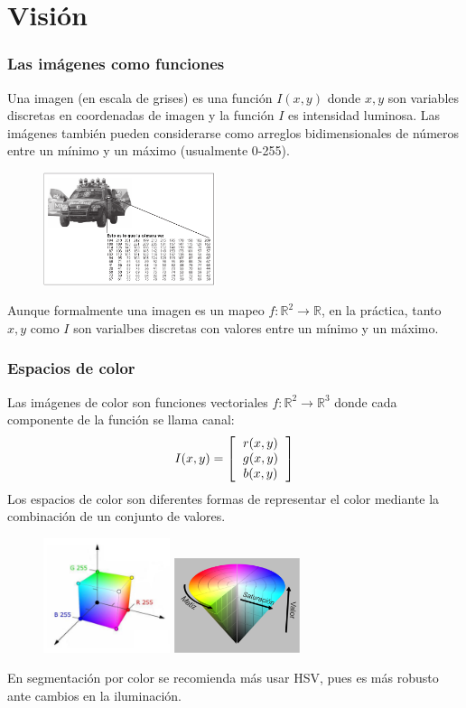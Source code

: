 \section{Visión}
\begin{frame}\frametitle{Las imágenes como funciones}
Una imagen (en escala de grises) es una función $I(x,y)$ donde $x,y$ son variables discretas en coordenadas de imagen y la función $I$ es intensidad luminosa. Las imágenes también pueden considerarse como arreglos bidimensionales de números entre un mínimo y un máximo (usualmente 0-255).
\begin{figure}
  \centering
  \includegraphics[width=0.45\textwidth]{Figures/representation_image.png}
\end{figure}
  Aunque formalmente una imagen es un mapeo $f:\mathbb{R}^2\rightarrow \mathbb{R}$, en la práctica, tanto $x,y$ como $I$ son varialbes discretas con valores entre un mínimo y un máximo.
\end{frame}

\begin{frame}\frametitle{Espacios de color}
  Las imágenes de color son funciones vectoriales $f:\mathbb{R}^2\rightarrow \mathbb{R}^3$ donde cada componente de la función se llama canal:
  \[I(x,y) = \left[\begin{tabular}{c}$r(x,y)$\\$g(x,y)$\\$b(x,y)$\end{tabular}\right]\]  
  Los espacios de color son diferentes formas de representar el color mediante la combinación de un conjunto de valores. 
  \begin{figure}
    \centering
    \includegraphics[width=0.33\textwidth]{Figures/RGB_model.pdf}
    \includegraphics[width=0.33\textwidth]{Figures/hsv_space.pdf}
  \end{figure}
  En segmentación por color se recomienda más usar HSV, pues es más robusto ante cambios en la iluminación.
\end{frame}

